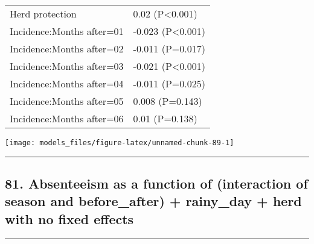 \documentclass[]{article}
\begin{document}
\begin{longtable}[t]{ll}
\hspace{1em}Herd protection & 0.02 (P<0.001)\\
\hspace{1em}Incidence:Months after=01 & -0.023 (P<0.001)\\
\hspace{1em}Incidence:Months after=02 & -0.011 (P=0.017)\\
\hspace{1em}Incidence:Months after=03 & -0.021 (P<0.001)\\
\hspace{1em}Incidence:Months after=04 & -0.011 (P=0.025)\\
\hspace{1em}Incidence:Months after=05 & 0.008 (P=0.143)\\
\hspace{1em}Incidence:Months after=06 & 0.01 (P=0.138)\\*
\end{longtable}

\begin{center}\texttt{[image: models\_files/figure-latex/unnamed-chunk-89-1]} \end{center}

\newpage

\begin{center}\rule{0.5\linewidth}{\linethickness}\end{center}

\subsection{81. Absenteeism as a function of (interaction of season and
before\_after) + rainy\_day + herd with no fixed
effects}\label{absenteeism-as-a-function-of-interaction-of-season-and-before_after-rainy_day-herd-with-no-fixed-effects}

\begin{center}\rule{0.5\linewidth}{\linethickness}\end{center}
\end{document}

